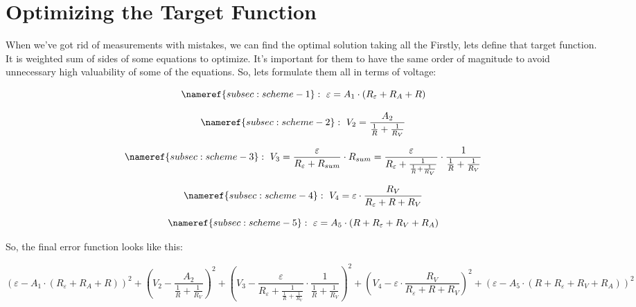 \documentclass[11pt]{memoir}
\begin{document}
    \newpage
    \section{Optimizing the Target Function}\label{sec:optimizing-the-target-function}
    When we've got rid of measurements with mistakes, we can find the optimal solution taking all the
    Firstly, lets define that target function.
    It is weighted sum of sides of some equations to optimize.
    It's important for them to have the same order of magnitude to avoid unnecessary high valuability of some of the equations.
    So, lets formulate them all in terms of voltage:

    \begin{equation*}
        \nameref{subsec:scheme-1}:~ \varepsilon = A_1 \cdot \left( R_{\varepsilon} + R_A + R \right)
    \end{equation*}

    \begin{equation*}
        \nameref{subsec:scheme-2}:~ V_2 = \frac{A_2}{ \frac{1}{R} + \frac{1}{R_V} }
    \end{equation*}

    \begin{equation*}
        \nameref{subsec:scheme-3}:~ V_3 = \frac{\varepsilon}{R_\varepsilon + R_{sum}} \cdot R_{sum} =
        \frac{\varepsilon}{R_\varepsilon + \frac{1}{\frac{1}{R} + \frac{1}{R_V}}} \cdot \frac{1}{\frac{1}{R} + \frac{1}{R_V}}
    \end{equation*}

    \begin{equation*}
        \nameref{subsec:scheme-4}:~ V_4 = \varepsilon \cdot \frac{R_V}{R_\varepsilon + R + R_V}
    \end{equation*}

    \begin{equation*}
        \nameref{subsec:scheme-5}:~ \varepsilon = A_5 \cdot \left( R + R_\varepsilon + R_V + R_A \right)
    \end{equation*}

    So, the final error function looks like this:

    \begin{dmath*}
        (\varepsilon - A_1 \cdot \left( R_{\varepsilon} + R_A + R \right))^2 +
        (V_2 - \frac{A_2}{ \frac{1}{R} + \frac{1}{R_V} })^2 +
        (V_3 - \frac{\varepsilon}{R_\varepsilon + \frac{1}{\frac{1}{R} + \frac{1}{R_V}}} \cdot \frac{1}{\frac{1}{R} + \frac{1}{R_V}})^2 +
        (V_4 - \varepsilon \cdot \frac{R_V}{R_\varepsilon + R + R_V})^2 +
        (\varepsilon - A_5 \cdot \left( R + R_\varepsilon + R_V + R_A \right))^2
    \end{dmath*}
\end{document}
